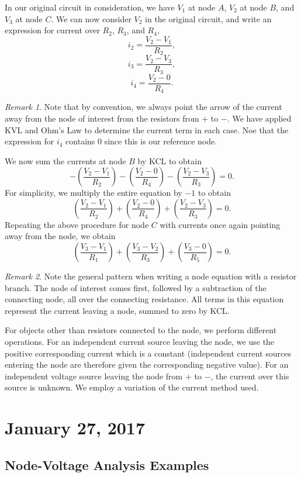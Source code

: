 \documentclass[11pt]{article}
\theoremstyle{plain} %
\theoremstyle{definition}
\theoremstyle{example}
\theoremstyle{remark}
\newtheorem*{remark}{Remark}
\begin{document}
In our original circuit in consideration, we have $V_1$ at node $A$, $V_2$ at node $B$, and $V_3$ at node $C$. We can now consider $V_2$ in the original circuit, and write an expression for current over $R_2$, $R_3$, and $R_4$,
$$i_2 = \frac{V_2-V_1}{R_2},$$
$$i_3 = \frac{V_2-V_3}{R_3},$$
$$i_4 = \frac{V_2-0}{R_4}.$$

\begin{remark}Note that by convention, we always point the arrow of the current away from the node of interest from the resistors from $+$ to $-$. We have applied KVL and Ohm's Law to determine the current term in each case. Noe that the expression for $i_4$ contains $0$ since this is our reference node.
\end{remark}
 We now sum the currents at node $B$ by KCL to obtain 
$$-\left(\frac{V_2-V_1}{R_2}\right)-\left(\frac{V_2-0}{R_4}\right)-\left(\frac{V_2-V_3}{R_3}\right)=0.$$
For simplicity, we multiply the entire equation by $-1$ to obtain 
$$\left(\frac{V_2-V_1}{R_2}\right)+\left(\frac{V_2-0}{R_4}\right)+\left(\frac{V_2-V_3}{R_3}\right)=0.$$
Repeating the above procedure for node $C$ with currents once again pointing away from the node, we obtain 
$$\left(\frac{V_3-V_1}{R_1}\right)+\left(\frac{V_3-V_2}{R_3}\right)+\left(\frac{V_3-0}{R_5}\right)=0.$$
\begin{remark}
Note the general pattern when writing a node equation with a resistor branch. The node of interest comes first, followed by a subtraction of the connecting node, all over the connecting resistance. All terms in this equation represent the current leaving a node, summed to zero by KCL.
\end{remark}
For objects other than resistors connected to the node, we perform different operations. For an independent current source leaving the node, we use the positive corresponding current which is a constant (independent current sources entering the node are therefore given the corresponding negative value). For an independent voltage source leaving the node from $+$ to $-$, the current over this source is unknown. We employ a variation of the current method used. 

\section{January 27, 2017}
\subsection{Node-Voltage Analysis Examples}
\end{document}
